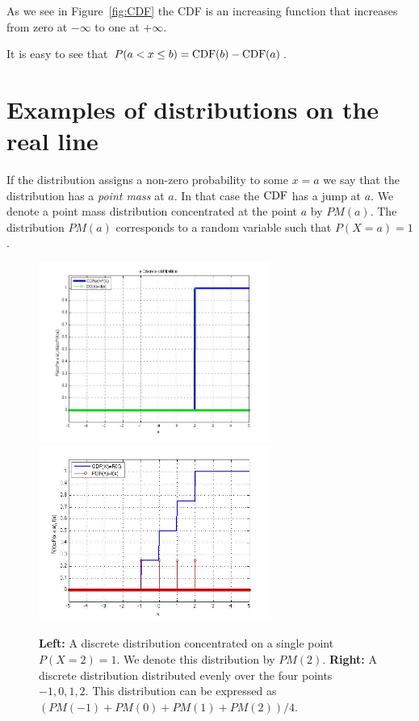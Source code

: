 As we see in Figure~\ref{fig:CDF} the CDF is an increasing function that
increases from zero at $-\infty$ to one at $+\infty$.

It is easy to see that $P(a<x\leq b)=\mbox{CDF}(b)-\mbox{CDF}(a)$.


\section{Examples of distributions on the real line}
If the distribution assigns a non-zero probability to some $x=a$ we
say that the distribution has a {\em point mass} at $a$. In that case
the $\mbox{CDF}$ has a jump at $a$. We denote a point mass distribution
concentrated at the point $a$ by $PM(a)$. The distribution $PM(a)$
corresponds to a random variable such that $P(X=a)=1$.

\begin{figure}[t]
\begin{center}
\includegraphics[width=3in]{figs/Discrete1.jpg}
\includegraphics[width=3in]{figs/4PointMass.jpg}
\end{center}
\caption{{\bf Left:} A discrete distribution concentrated on a single
  point $P(X=2)=1$. We denote this distribution by $PM(2)$.  {\bf
    Right:} A discrete distribution distributed evenly over the four
  points $-1,0,1,2$. This distribution can be expressed as $(PM(-1)+PM(0)+PM(1)+PM(2))/4$.}
\end{figure}

